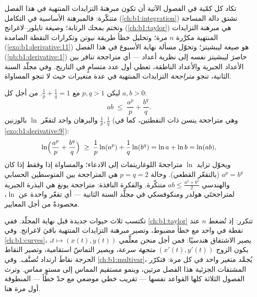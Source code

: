 \begin{remark}
تكاد كل  كمّية في الفصول الآتية أن تكون مبرهنةَ
التزايدات المنتهية في هذا الفصل متنكّرة: فالمبرهنة الأساسية
في التكامل (\cref{ch:b1:integration}) تشتق دالة
المساحة وتختم بمحك الرتابة؛ وصيغة
تايلور--لاغرانج (\cref{ch:b1:taylor}) هي مبرهنة التزايدات
المنتهية مكرَّرة $n$ مرة؛ وتحليل خطأ طريقة نيوتن
وتكرارات النقطة الصامدة (\cref{exo:b1:derivative:11}) هو
صيغة ليبشيتز؛ وتحوّل مسألة نهاية الأسبوع في هذا الفصل
(\cref{pb:b1:derivative:1}) حاصرَ ليبشيتز نفسه إلى
نظرية أعداد --- أي متراجحة تنافر بين الأعداد
الجبرية والأعداد الناطقة، تعطي أول عدد متسامٍ
في التاريخ. وفي مجلّد السنة الثانية، تنجو \emph{متراجحة}
التزايدات المنتهية في عدة متغيرات حيث لا تنجو المساواة.
\end{remark}

\begin{example}\label{ex:b1:derivative:young}
ليكن $p, q > 1$ مع $\frac1p + \frac1q = 1$. من أجل كل $a, b > 0$:
\[
ab \;\leq\; \frac{a^p}{p} + \frac{b^q}{q} .
\]
والبرهان  واحد لتقعّر $\ln$ بالوزنين
$\frac1p, \frac1q$ (وهي متراجحة ينسن ذات النقطتين، كما في
\cref{exo:b1:derivative:9}):
\[
\ln\Bigl(\frac{a^p}{p} + \frac{b^q}{q}\Bigr)
\;\geq\; \frac1p \ln(a^p) + \frac1q \ln(b^q)
= \ln a + \ln b = \ln(ab),
\]
ويحوّل تزايد $\ln$ متراجحةَ اللوغاريتمات إلى
الادعاء؛ والمساواة إذا وفقط إذا كان $a^p = b^q$ (بالتقعّر القطعي). وحالة
$p = q = 2$ هي المتراجحة بين المتوسطين الحسابي والهندسي $ab \leq
\frac{a^2 + b^2}{2}$ متنكّرة. والفكرة النافذة: متراجحة
يونغ هي البذرة الجبرية لمتراجحتَي هولدر ومنكوفسكي
في مجلّد السنة الثانية --- أي  تقعّر واحدة
عن $\ln$، محصودةً من أجل المعايير.
\end{example}

\begin{remark}
تكتسب  ثلاث حيوات جديدة قبل نهاية المجلّد.
ففي \cref{ch:b1:taylor} تتكرر: إذ تُضغط $n$  عند نقطة
في  واحد مع خطأ مضبوط، وتصير
مبرهنة التزايدات المنتهية باقيَ لاغرانج. وفي
\cref{ch:b1:curves}، يصير الاشتقاق هندسيًا: فمن أجل
منحن معلَّمي $t \mapsto (x(t), y(t))$، يكون الزوج $(x'(t),
y'(t))$ \emph{متجهة} سرعة، ويصير التماسّ
استقامية، وتصير النقاط الحرجة نقاطَ ارتداد تُصنَّف. وفي
\cref{ch:b1:multivar}، يُجمَّد متغير واحد في كل مرة: فتكرّر
المشتقات الجزئية هذا الفصل مرتين، وينمو مستقيم المماس
إلى مستوٍ مماس. وترث الفصول الثلاثة كلها القواعد نفسها ---
تقريب خطي موضعي مع حدّ خطأ ---
المنطوقة أول مرة هنا.
\end{remark}

